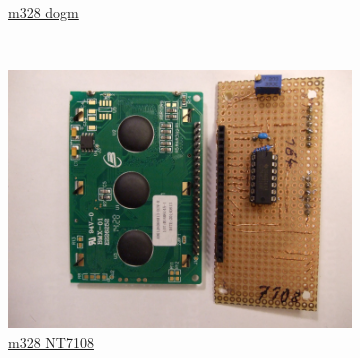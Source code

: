 \documentclass[pdftex,12pt,a4paper,english]{article}
\begin{document}
\begin{figure}[H]
\begin{subfigure}[b]{.3\textwidth}
	  {\href{run:./trunk/mega328_dogm}{m328 dogm}}
  \end{subfigure}
~
  \begin{subfigure}[b]{.3\textwidth}	%
    \centering
    \includegraphics[width=1.\textwidth]{../PNG/Adapter_7108.JPG}
	  \\ \vspace{-0.5em}
	  {\href{run:./trunk/mega328_st7108}{m328 NT7108}}
  \end{subfigure}
\end{figure}
\end{document}
